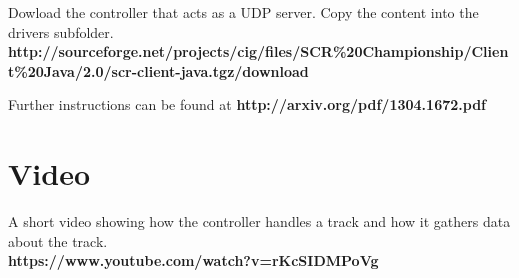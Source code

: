 \documentclass[conference]{IEEEtran}
\begin{document}
\begin{appendices}
Dowload the controller that acts as a UDP server. Copy the content into the drivers subfolder.\\
\textbf{http://sourceforge.net/projects/cig/files/SCR\%20Championship/Client\%20Java/2.0/scr-client-java.tgz/download}

Further instructions can be found at \textbf{http://arxiv.org/pdf/1304.1672.pdf}

\section{Video}
A short video showing how the controller handles a track and how it gathers data about the track.\\
\textbf{https://www.youtube.com/watch?v=rKcSIDMPoVg}
\end{appendices}
\end{document}
